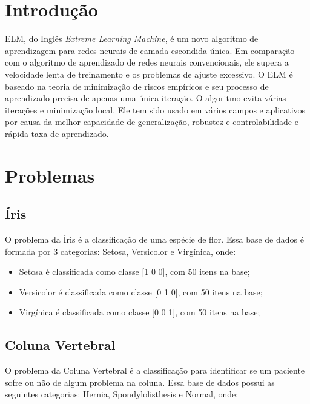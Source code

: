 \renewcommand{\figurename}{Figura}

\section{Introdução}

ELM, do Inglês \emph{Extreme Learning Machine}, é um novo algoritmo de
aprendizagem para redes neurais de camada escondida única. Em comparação
com o algoritmo de aprendizado de redes neurais convencionais, ele
supera a velocidade lenta de treinamento e os problemas de ajuste
excessivo. O ELM é baseado na teoria de minimização de riscos empíricos
e seu processo de aprendizado precisa de apenas uma única iteração. O
algoritmo evita várias iterações e minimização local. Ele tem sido usado
em vários campos e aplicativos por causa da melhor capacidade de
generalização, robustez e controlabilidade e rápida taxa de aprendizado.

\section{Problemas}

\subsection{Íris}

O problema da Íris é a classificação de uma espécie de flor. Essa base
de dados é formada por 3 categorias: Setosa, Versicolor e Virgínica,
onde:

\begin{itemize}
\tightlist
\item
  Setosa é classificada como classe {[}1 0 0{]}, com 50 itens na base;
\item
  Versicolor é classificada como classe {[}0 1 0{]}, com 50 itens na
  base;
\item
  Virgínica é classificada como classe {[}0 0 1{]}, com 50 itens na
  base;
\end{itemize}

\subsection{Coluna Vertebral}

O problema da Coluna Vertebral é a classificação para identificar se um
paciente sofre ou não de algum problema na coluna. Essa base de dados
possui as seguintes categorias: Hernia, Spondylolisthesis e Normal,
onde:

